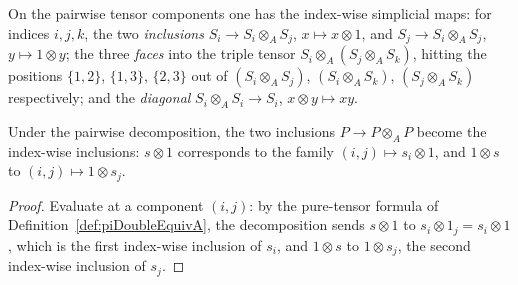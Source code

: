\begin{definition}
  \label{def:indexwiseMaps}
  \leanok
  On the pairwise tensor components one has the index-wise simplicial maps: for indices
  \(i, j, k\), the two \emph{inclusions} \(S_i \to S_i \otimes_A S_j\), \(x \mapsto x \otimes 1\),
  and \(S_j \to S_i \otimes_A S_j\), \(y \mapsto 1 \otimes y\); the three \emph{faces} into the
  triple tensor \(S_i \otimes_A (S_j \otimes_A S_k)\), hitting the positions \(\{1,2\}\),
  \(\{1,3\}\), \(\{2,3\}\) out of \((S_i \otimes_A S_j)\), \((S_i \otimes_A S_k)\),
  \((S_j \otimes_A S_k)\) respectively; and the \emph{diagonal}
  \(S_i \otimes_A S_i \to S_i\), \(x \otimes y \mapsto xy\).
\end{definition}

\begin{lemma}
  \label{lem:descentIncl_transport}
  \leanok
  Under the pairwise decomposition, the two inclusions \(P \to P \otimes_A P\) become the
  index-wise inclusions: \(s \otimes 1\) corresponds to the family
  \((i,j) \mapsto s_i \otimes 1\), and \(1 \otimes s\) to \((i,j) \mapsto 1 \otimes s_j\).
\end{lemma}
\begin{proof}
  \leanok
  Evaluate at a component \((i,j)\): by the pure-tensor formula of
  Definition~\ref{def:piDoubleEquivA}, the decomposition sends \(s \otimes 1\) to
  \(s_i \otimes 1_j = s_i \otimes 1\), which is the first index-wise inclusion of \(s_i\), and
  \(1 \otimes s\) to \(1 \otimes s_j\), the second index-wise inclusion of \(s_j\).
\end{proof}


